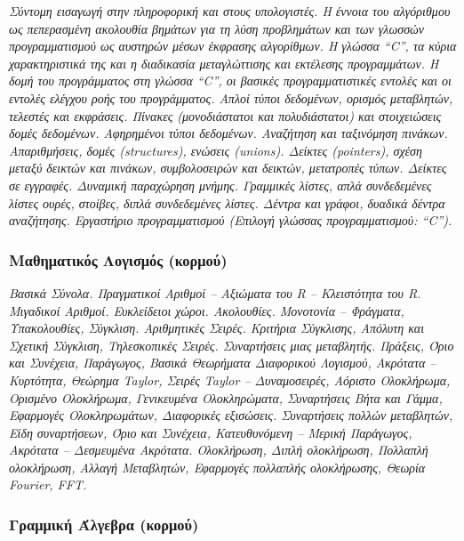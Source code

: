 \emph{Σύντομη εισαγωγή στην πληροφορική και στους υπολογιστές. Η έννοια
του αλγόριθμου ως πεπερασμένη ακολουθία βημάτων για τη λύση προβλημάτων
και των γλωσσών προγραμματισμού ως αυστηρών μέσων έκφρασης αλγορίθμων. Η
γλώσσα ``C'', τα κύρια χαρακτηριστικά της και η διαδικασία μεταγλώττισης
και εκτέλεσης προγραμμάτων. Η δομή του προγράμματος στη γλώσσα ``C'', οι
βασικές προγραμματιστικές εντολές και οι εντολές ελέγχου ροής του
προγράμματος. Απλοί τύποι δεδομένων, ορισμός μεταβλητών, τελεστές και
εκφράσεις. Πίνακες (μονοδιάστατοι και πολυδιάστατοι) και στοιχειώσεις
δομές δεδομένων. Αφηρημένοι τύποι δεδομένων. Αναζήτηση και ταξινόμηση
πινάκων. Απαριθμήσεις, δομές (structures), ενώσεις (unions). Δείκτες
(pointers), σχέση μεταξύ δεικτών και πινάκων, συμβολοσειρών και δεικτών,
μετατροπές τύπων. Δείκτες σε εγγραφές. Δυναμική παραχώρηση μνήμης.
Γραμμικές λίστες, απλά συνδεδεμένες λίστες ουρές, στοίβες, διπλά
συνδεδεμένες λίστες. Δέντρα και γράφοι, δυαδικά δέντρα αναζήτησης.
Εργαστήριο προγραμματισμού (Επιλογή γλώσσας προγραμματισμού: ``C'').}

\hypertarget{ux3bcux3b1ux3b8ux3b7ux3bcux3b1ux3c4ux3b9ux3baux3ccux3c2-ux3bbux3bfux3b3ux3b9ux3c3ux3bcux3ccux3c2-ux3baux3bfux3c1ux3bcux3bfux3cd}{%
\subsubsection{Μαθηματικός Λογισμός
(κορμού)}\label{ux3bcux3b1ux3b8ux3b7ux3bcux3b1ux3c4ux3b9ux3baux3ccux3c2-ux3bbux3bfux3b3ux3b9ux3c3ux3bcux3ccux3c2-ux3baux3bfux3c1ux3bcux3bfux3cd}}

\emph{Βασικά Σύνολα. Πραγματικοί Αριθμοί -- Αξιώματα του R --
Κλειστότητα του R. Μιγαδικοί Αριθμοί. Ευκλείδειοι χώροι. Ακολουθίες.
Μονοτονία -- Φράγματα, Υπακολουθίες, Σύγκλιση. Αριθμητικές Σειρές.
Κριτήρια Σύγκλισης, Απόλυτη και Σχετική Σύγκλιση, Τηλεσκοπικές Σειρές.
Συναρτήσεις μιας μεταβλητής. Πράξεις, Όριο και Συνέχεια, Παράγωγος,
Βασικά Θεωρήματα Διαφορικού Λογισμού, Ακρότατα -- Κυρτότητα, Θεώρημα
Taylor, Σειρές Taylor -- Δυναμοσειρές, Αόριστο Ολοκλήρωμα, Ορισμένο
Ολοκλήρωμα, Γενικευμένα Ολοκληρώματα, Συναρτήσεις Βήτα και Γάμμα,
Εφαρμογές Ολοκληρωμάτων, Διαφορικές εξισώσεις. Συναρτήσεις πολλών
μεταβλητών, Είδη συναρτήσεων, Όριο και Συνέχεια, Κατευθυνόμενη -- Μερική
Παράγωγος, Ακρότατα -- Δεσμευμένα Ακρότατα. Ολοκλήρωση, Διπλή
ολοκλήρωση, Πολλαπλή ολοκλήρωση, Αλλαγή Μεταβλητών, Εφαρμογές πολλαπλής
ολοκλήρωσης, Θεωρία Fourier, FFT.}

\hypertarget{ux3b3ux3c1ux3b1ux3bcux3bcux3b9ux3baux3ae-ux3acux3bbux3b3ux3b5ux3b2ux3c1ux3b1-ux3baux3bfux3c1ux3bcux3bfux3cd}{%
\subsubsection{Γραμμική Άλγεβρα
(κορμού)}\label{ux3b3ux3c1ux3b1ux3bcux3bcux3b9ux3baux3ae-ux3acux3bbux3b3ux3b5ux3b2ux3c1ux3b1-ux3baux3bfux3c1ux3bcux3bfux3cd}}

